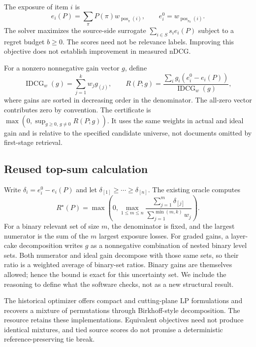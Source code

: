 \documentclass[runningheads]{llncs}
\begin{document}
The exposure of item $i$ is
\[
 e_i(P)=\sum_{\pi} P(\pi)w_{\operatorname{pos}_{\pi}(i)},\qquad
 e_i^0=w_{\operatorname{pos}_{\pi_0}(i)}.
\]
The solver maximizes the source-side surrogate
$\sum_{i\in S}s_i e_i(P)$ subject to a regret budget $b\geq0$.
The scores need not be relevance labels. Improving this objective does not
establish improvement in measured nDCG.

For a nonzero nonnegative gain vector $g$, define
\[
 \operatorname{IDCG}_w(g)=\sum_{j=1}^{k} w_j g_{(j)},\qquad
 R(P;g)=\frac{\sum_i g_i(e_i^0-e_i(P))}
                  {\operatorname{IDCG}_w(g)},
\]
where gains are sorted in decreasing order in the denominator.
The all-zero vector contributes zero by convention. The certificate is
$\max(0,\sup_{g\geq0,\,g\ne0} R(P;g))$.
It uses the same weights in actual and ideal gain and is relative to the
specified candidate universe, not documents omitted by first-stage retrieval.

\subsection{Reused top-sum calculation}
Write $\delta_i=e_i^0-e_i(P)$ and let $\delta_{[1]}\geq\cdots\geq
\delta_{[n]}$. The existing oracle computes
\begin{equation}
 R^\star(P)=\max\left(0,\max_{1\leq m\leq n}
 \frac{\sum_{j=1}^{m}\delta_{[j]}}
      {\sum_{j=1}^{\min(m,k)}w_j}\right).
 \label{eq:regret}
\end{equation}
For a binary relevant set of size $m$, the denominator is fixed, and the
largest numerator is the sum of the $m$ largest exposure losses.
For graded gains, a layer-cake decomposition writes $g$ as a nonnegative
combination of nested binary level sets. Both numerator and ideal gain
decompose with those same sets, so their ratio is a weighted average of
binary-set ratios. Binary gains are themselves allowed; hence the bound is
exact for this uncertainty set. We include the reasoning to define what the
software checks, not as a new structural result.

The historical optimizer offers compact and cutting-plane LP formulations
and recovers a mixture of permutations through Birkhoff-style decomposition.
The resource retains these implementations. Equivalent objectives need not
produce identical mixtures, and tied source scores do not promise a
deterministic reference-preserving tie break.
\end{document}
